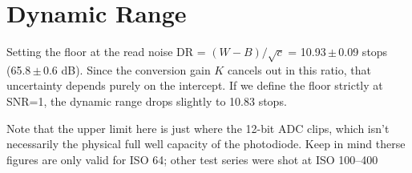 \documentclass[9pt]{extarticle}
\begin{document}
\section{Dynamic Range}Setting the floor at the read noise DR = $(W-B)/\sqrt{c}$ = 10.93\,$\pm$\,0.09 stops (65.8\,$\pm$\,0.6 dB). Since the conversion gain $K$ cancels out in this ratio, that uncertainty depends purely on the intercept. If we define the floor strictly at SNR=1, the dynamic range drops slightly to 10.83 stops.

Note that the upper limit here is just where the 12-bit ADC clips, which isn't necessarily the physical full well capacity of the photodiode. Keep in mind therse figures are only valid for ISO 64; other test series were shot at ISO 100--400

\end{document}
